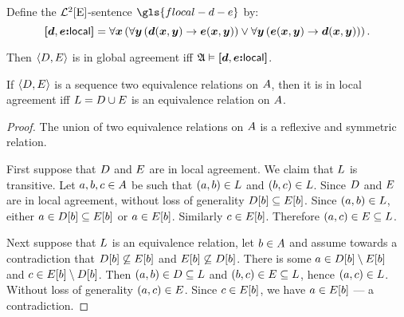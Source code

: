 \begin{definition}
Define the $\mathcal{L}^{2}[\mathrm{E}]$-sentence $\gls{flocal-d-e}$ by:
\[
{\bm{[}\bm{d},\bm{e}\mathord{\bm{:}}\mathsf{local}\bm{]}} =
    \forall \bm{x} 
    \left(\forall \bm{y} \left(\bm{d}(\bm{x},\bm{y}) \rightarrow \bm{e}(\bm{x},\bm{y})\right)
    \lor 
    \forall \bm{y} \left(\bm{e}(\bm{x},\bm{y}) \rightarrow \bm{d}(\bm{x},\bm{y})\right)\right).
\]
\end{definition}
Then $\left\langle D, E \right\rangle$ is in global agreement iff
$\mathfrak{A} \vDash {\bm{[}\bm{d},\bm{e}\mathord{\bm{:}}\mathsf{local}\bm{]}}$.

\begin{lemma}\label{lem:local-2}
If $\left\langle D, E \right\rangle$ is a sequence two equivalence relations on $A$, then
it is in local agreement iff $L = D \cup E$ is an equivalence
relation on $A$.
\end{lemma}
\begin{proof}
The union of two equivalence relations on $A$ is a reflexive and symmetric
relation.

First suppose that $D$ and $E$ are in local agreement.
We claim that $L$ is transitive.
Let $a, b, c \in A$ be such that $(a, b) \in L$ and 
$(b, c) \in L$.
Since $D$ and $E$ are in local agreement,
without loss of generality $D[b] \subseteq E[b]$.
Since $(a, b) \in L$, either $a \in D[b] \subseteq E[b]$
or $a \in E[b]$.
Similarly $c \in E[b]$.
Therefore $(a, c) \in E \subseteq L$.
    
Next suppose that $L$ is an equivalence relation, let $b \in A$ and
assume towards a contradiction
that $D[b] \not\subseteq E[b]$ and $E[b] \not\subseteq
D[b]$.
There is some $a \in D[b] \setminus E[b]$ and $c \in E[b]
\setminus D[b]$.
Then $(a, b) \in D \subseteq L$ and $(b, c) \in E \subseteq
L$, hence $(a, c) \in L$.
Without loss of generality $(a, c) \in E$.
Since $c \in E[b]$, we have $a \in E[b]$ --- a contradiction.
\end{proof}